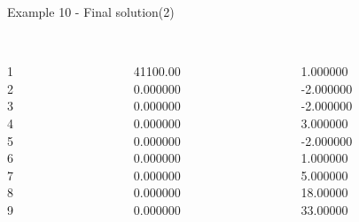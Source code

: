\begin{frame}{Example 10 - Final solution(2)}
\footnotesize
\begin{columns}[t]
\begin{column}{0.3\textwidth}
\\
1\\
2\\
3\\
4\\
5\\
6\\
7\\
8\\
9\\

\end{column}
\begin{column}{0.3\textwidth}
\\
41100.00\\
0.000000\\
0.000000\\
0.000000\\
0.000000\\
0.000000\\
0.000000\\
0.000000\\
0.000000\\

\end{column}  

\begin{column}{0.3\textwidth}
\\
1.000000\\
-2.000000\\
-2.000000\\
3.000000\\
-2.000000\\
1.000000\\
5.000000\\
18.00000\\
33.00000\\

\end{column}
\end{columns}  
\end{frame}


